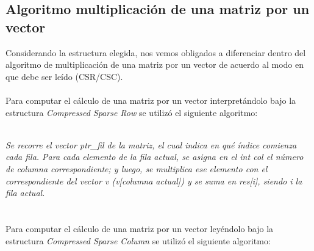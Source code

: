 \documentclass[a4paper]{article}
\begin{document}
\subsection{Algoritmo multiplicaci\'on de una matriz por un vector}
 Considerando la estructura elegida, nos vemos obligados a diferenciar dentro del algoritmo de multiplicaci\'on de una matriz por un vector de acuerdo al modo en que debe ser le\'ido (CSR/CSC).\\
 \\
\indent Para computar el c\'alculo de una matriz por un vector interpret\'andolo bajo la estructura \emph{Compressed Sparse Row} se utiliz\'o el siguiente algoritmo: \\
\IncMargin{1em}
\begin{algorithm}

\BlankLine
{}
\end{algorithm}\DecMargin{1em}
\\
\textit{Se recorre el vector ptr_fil de la matriz, el cual indica en qu\'e \'indice comienza cada fila. Para cada elemento de la fila actual, se asigna en el int col el n\'umero de columna correspondiente; y luego, se multiplica ese elemento con el correspondiente del vector v (v[columna actual]) y se suma en res[i], siendo i la fila actual.}
\\
 \\
 \\
  \indent Para computar el c\'alculo de una matriz por un vector ley\'endolo bajo la estructura \emph{Compressed Sparse Column} se utiliz\'o el siguiente algoritmo: \\
   \\
\IncMargin{1em}
\begin{algorithm}

\BlankLine
{}
\end{algorithm}\DecMargin{1em}
\\
\end{document}
